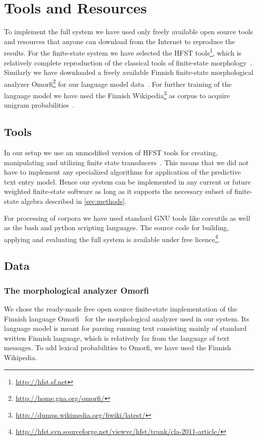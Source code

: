 \documentclass[a4paper,conference]{IEEEtran}
\begin{document}
\section{Tools and Resources}
\label{sec:tools}

To implement the full system we have used only freely available open
source tools and resources that anyone can download from the Internet
to reproduce the results. For the finite-state system we have selected
the HFST tools\footnote{\url{http://hfst.sf.net}}, which is relatively
complete reproduction of the classical tools of finite-state
morphology~\cite{beesley/2003}. Similarly we have downloaded a freely
available Finnish finite-state morphological analyzer
Omorfi\footnote{\url{http://home.gna.org/omorfi/}} for our language
model data~\cite{pirinen/2011/nodalida}. For further training of the
language model we have used the Finnish
Wikipedia\footnote{\url{http://dumps.wikimedia.org/fiwiki/latest/}} as
corpus to acquire unigram probabilities~\cite{pirinen/2010/lrec}.

\subsection{Tools}

In our setup we use an unmodified version of HFST tools for creating,
manipulating and utilizing finite state
transducers~\cite{hfst/2011}. This means that we did not have to
implement any specialized algorithms for application of the predictive
text entry model. Hence our system can be implemented in any current
or future weighted finite-state software as long as it supports the
necessary subset of finite-state algebra described in
\ref{sec:methods}.

For processing of corpora we have used standard GNU tools like
coreutils as well as the bash and python scripting languages. The
source code for building, applying and evaluating the full system is
available under free
licence\footnote{\url{http://hfst.svn.sourceforge.net/viewvc/hfst/trunk/cla-2011-article/}}.

\subsection{Data}
\label{sec:data}

\subsubsection{The morphological analyzer Omorfi} 
We chose the ready-made free open source finite-state implementation
of the Finnish language Omorfi~\cite{pirinen/2011/nodalida} for the
morphological analyzer used in our system.  Its language model is
meant for parsing running text consisting mainly of standard written
Finnish language, which is relatively far from the language of text
messages. To add lexical probabilities to Omorfi, we have used the
Finnish Wikipedia.
\end{document}
